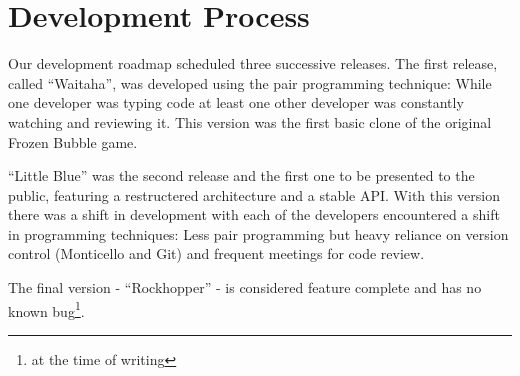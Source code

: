 \section{Development Process}
Our development roadmap scheduled three successive releases. 
The first release, called ``Waitaha'', was developed using 
the pair programming technique: While one developer was 
typing code at least one other developer was constantly 
watching and reviewing it. This version was the first 
basic clone of the original Frozen Bubble game.

``Little Blue'' was the second release and the first one 
to be presented to the public, featuring a restructered 
architecture and a stable API. With this version there was 
a shift in development with each of the developers encountered 
a shift in programming techniques: Less pair programming but heavy 
reliance on version control (Monticello and Git) and frequent 
meetings for code review.

The final version - ``Rockhopper'' - is considered feature 
complete and has no known bug\footnote{at the time of writing}.
